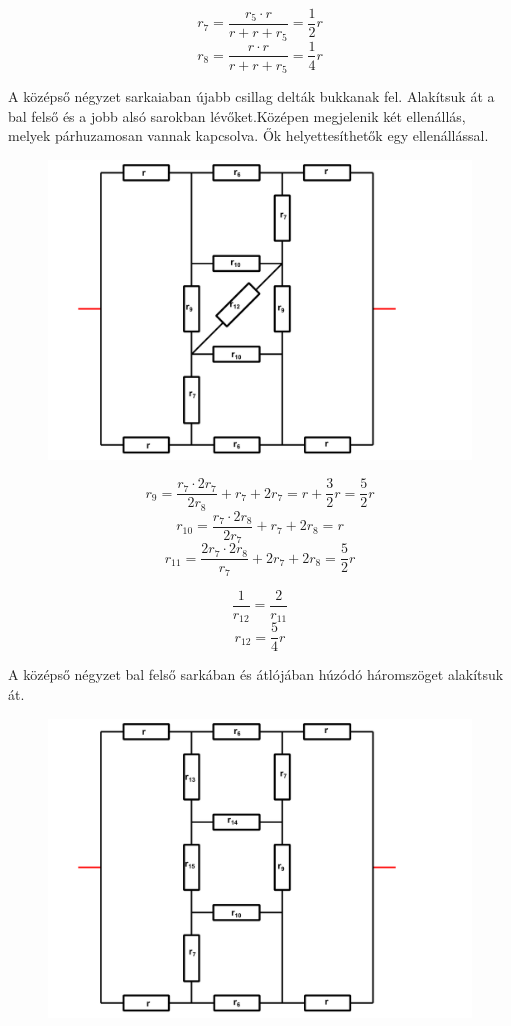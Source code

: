 \documentclass[11pt,a4paper,openany,leqno]{article}
\begin{document}
$$ r_7 = \frac{r_5 \cdot r}{r + r + r_5} = \frac{1}{2}r $$
$$ r_8 = \frac{r \cdot r}{r + r + r_5} = \frac{1}{4}r $$

\newpage
\indent
A középső négyzet sarkaiaban újabb csillag delták bukkanak fel. Alakítsuk át a bal felső és a jobb alsó sarokban lévőket.Középen megjelenik két ellenállás, melyek párhuzamosan vannak kapcsolva. Ők helyettesíthetők egy ellenállással.\\

\begin{figure}[h!]
\centering
  \includegraphics[width=150mm,scale=0.5]{grid_3_6.pdf}
  \caption{}
  \label{}
\end{figure}
$$ r_9 = \frac{r_7 \cdot 2r_7}{2r_8} + r_7 + 2 r_7 = r + \frac{3}{2}r = \frac{5}{2}r $$
$$ r_{10} = \frac{r_7 \cdot 2r_8}{2r_7} + r_7 + 2 r_8 = r $$
$$ r_{11} = \frac{2r_7 \cdot 2r_8}{r_7} + 2 r_7 + 2 r_8 = \frac{5}{2}r $$

$$ \frac{1}{r_{12}} = \frac{2}{r_{11}} $$
$$ r_{12} = \frac{5}{4}r $$

\newpage


A középső négyzet bal felső sarkában és átlójában húzódó háromszöget alakítsuk át.\\

\begin{figure}[h!]
\centering
  \includegraphics[width=150mm,scale=0.5]{grid_3_7.pdf}
  \caption{}
  \label{}
\end{figure}
\end{document}

